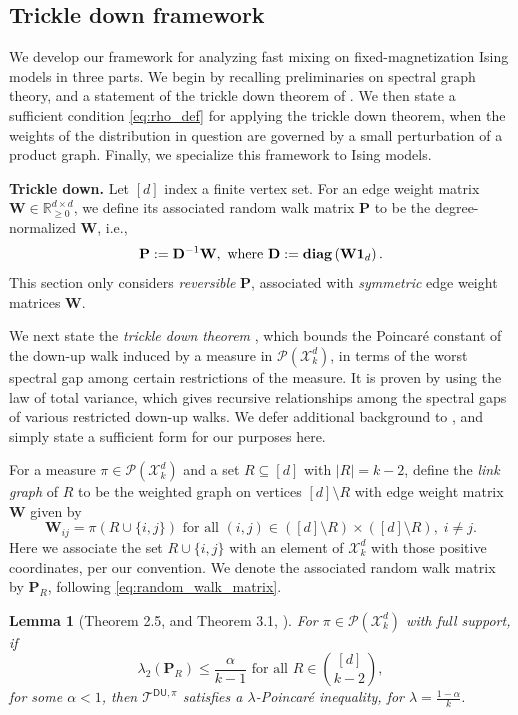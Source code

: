 \documentclass[11pt]{article}
\newtheorem{lemma}{Lemma}
\newcommand{\defeq}{:=}
\newcommand{\lam}{\lambda}
\newcommand{\R}{\mathbb{R}}
\newcommand{\diag}[1]{\textbf{\textup{diag}}\left(#1\right)}
\newcommand{\1}{\mathbf{1}}
\newcommand{\0}{\mathbf{0}}
\newcommand{\Par}[1]{\left(#1\right)}
\newcommand{\md}{{\mathbf{D}}}
\newcommand{\mpp}{{\mathbf{P}}}
\newcommand{\mw}{{\mathbf{W}}}
\newcommand{\calP}{{\mathcal{P}}}
\newcommand{\calT}{{\mathcal{T}}}
\newcommand{\calX}{{\mathcal{X}}}
\newcommand{\TDU}[1]{\calT^{\mathsf{DU}, #1}}
\begin{document}
\subsection{Trickle down framework}\label{ssec:prelims_trickle}

We develop our framework for analyzing fast mixing on fixed-magnetization Ising models in three parts. We begin by recalling preliminaries on spectral graph theory, and a statement of the trickle down theorem of \cite{oppenheim2018local, alev2020improved}. We then state a sufficient condition \eqref{eq:rho_def} for applying the trickle down theorem, when the weights of the distribution in question are governed by a small perturbation of a product graph. Finally, we specialize this framework to Ising models.

\textbf{Trickle down.} Let $[d]$ index a finite vertex set. For an edge weight matrix $\mw \in \R^{d \times d}_{\ge 0}$, we define its associated random walk matrix $\mpp$ to be the degree-normalized $\mw$, i.e.,
\begin{equation}\label{eq:random_walk_matrix}\mpp \defeq \md^{-1} \mw,\text{ where } \md \defeq \diag{\mw\1_d}.\end{equation}
This section only considers \emph{reversible} $\mpp$, associated with \emph{symmetric} edge weight matrices $\mw$. 

We next state the \emph{trickle down theorem} \cite{oppenheim2018local, alev2020improved}, which bounds the Poincar\'e constant of the down-up walk induced by a measure in $\calP(\calX_k^d)$, in terms of the worst spectral gap among certain restrictions of the measure. It is proven by using the law of total variance, which gives recursive relationships among the spectral gaps of various restricted down-up walks. We defer additional background to \cite{oppenheim2018local, alev2020improved}, and simply state a sufficient form for our purposes here.

For a measure $\pi \in \calP(\calX^d_k)$ and a set $R \subseteq [d]$ with $|R| = k - 2$, define the \emph{link graph} of $R$ to be the weighted graph on vertices $[d] \setminus R$ with edge weight matrix $\mw$ given by
\[\mw_{ij} = \pi(R \cup \{i, j\})\text{ for all } (i, j) \in ([d] \setminus R) \times ([d] \setminus R),\; i \neq j.\]
Here we associate the set $R \cup \{i, j\}$ with an element of $\calX^d_k$ with those positive coordinates, per our convention.
We denote the associated random walk matrix by $\mpp_R$, following \eqref{eq:random_walk_matrix}.

\begin{lemma}[Theorem 2.5, \cite{oppenheim2018local} and Theorem 3.1, \cite{alev2020improved}]\label{lem:trickledown}
For $\pi \in \calP(\calX^d_k)$ with full support, if 
\[\lam_2\Par{\mpp_R} \le \frac \alpha {k - 1} \text{ for all } R \in \binom{[d]}{k - 2},\]
for some $\alpha < 1$, then $\TDU{\pi}$ satisfies a $\lam$-Poincar\'e inequality, for $\lam = \frac{1 - \alpha}k$.
\end{lemma}
\end{document}
